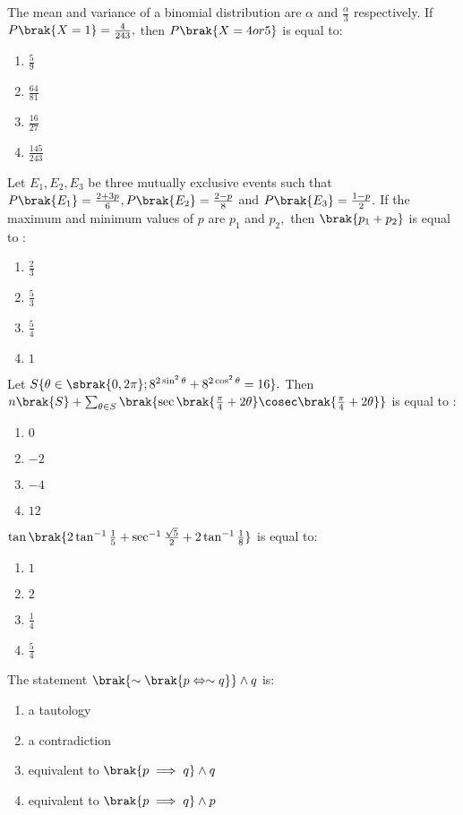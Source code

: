 \iffalse
    \title{2022}
    \author{EE24BTECH11029}
    \section{mcq-single}
\fi 

\item The mean and variance of a binomial distribution are $\alpha$ and $\frac{\alpha}{3}$ respectively. If $P\brak{X=1}=\frac{4}{243},$ then $P\brak{X=4 or 5}$ is equal to:
    \begin{enumerate}
        \item $\frac{5}{9}$
        \item $\frac{64}{81}$
        \item $\frac{16}{27}$
        \item $\frac{145}{243}$\\
    \end{enumerate}
    \item Let $E_1,E_2,E_3$ be three mutually exclusive events such that $P\brak{E_1}=\frac{2+3p}{6},P\brak{E_2}=\frac{2-p}{8}$ and $P\brak{E_3}=\frac{1-p}{2}.$ If the maximum and minimum values of $p$ are $p_1$ and $p_2,$ then $\brak{p_1+p_2}$ is equal to :
    \begin{enumerate}
        \item $\frac{2}{3}$
        \item $\frac{5}{3}$
        \item $\frac{5}{4}$
        \item $1$\\
    \end{enumerate}
    \item Let $S\{\theta\in\sbrak{0,2\pi};8^{2\sin^2\theta}+8^{2\cos^2\theta}=16\}.$ Then $n\brak{S}+\sum_{\theta\in S}\brak{\sec\brak{\frac{\pi}{4}+2\theta}\cosec\brak{\frac{\pi}{4}+2\theta}}$ is equal to :
    \begin{enumerate}
        \item $0$
        \item $-2$
        \item $-4$
        \item $12$\\
    \end{enumerate}
    \item $\tan\brak{2\tan^{-1}\frac{1}{5}+\sec^{-1}\frac{\sqrt{5}}{2}+2\tan^{-1}\frac{1}{8}}$ is equal to:
    \begin{enumerate}
        \item $1$
        \item $2$
        \item $\frac{1}{4}$
        \item $\frac{5}{4}$\\
    \end{enumerate}
    \item The statement $\brak{\sim\brak{p\Leftrightarrow\sim q}}\land q$ is:
    \begin{enumerate}
        \item a tautology
        \item a contradiction
        \item equivalent to $\brak{p\implies q}\land q$
        \item equivalent to $\brak{p\implies q}\land p$\\
    \end{enumerate}
